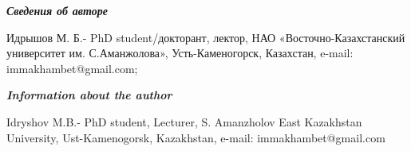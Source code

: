 \begin{authorinfo}
\emph{{\bfseries Сведения об авторе}}

Идрышов М. Б.- PhD student/докторант, лектор, НАО
«Восточно-Казахстанский университет им. С.Аманжолова», Усть-Каменогорск,
Казахстан, e-mail: immakhambet@gmail.com;

\emph{{\bfseries Information about the author}}

Idryshov M.B.- PhD student, Lecturer, S. Amanzholov East Kazakhstan
University, Ust-Kamenogorsk, Kazakhstan, e-mail: immakhambet@gmail.com
\end{authorinfo}
